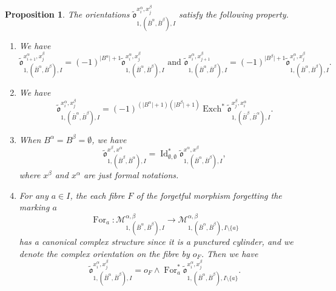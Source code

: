 \documentclass[11pt,a4paper]{article}
\newtheorem{prop}[dummy]{Proposition}
\theoremstyle{definition}
\theoremstyle{remark}
\numberwithin{equation}{section}
\DeclareMathOperator{\Id}{Id}
\begin{document}
\begin{prop}\label{prop orientation moduli g=1}
    The orientations $\tilde{\mathfrak o}^{x^\alpha_i,x^\beta_j}_{1,(\bar{B}^\alpha,\bar{B}^\beta),I}$ satisfy the following property.
    \begin{enumerate}
        \item \label{item orientation of moduli when change starting point genus one}
        We have
        \begin{equation}\label{eq orientation of moduli when change starting point genus one}
        \tilde{\mathfrak o}^{x^\alpha_{i+1},x^\beta_j}_{1,(\bar{B}^\alpha,\bar{B}^\beta),I}=(-1)^{\lvert B^\alpha \rvert+1}\tilde{\mathfrak o}^{x^\alpha_{i},x^\beta_j}_{1,(\bar{B}^\alpha,\bar{B}^\beta),I} \text{ and }
        \tilde{\mathfrak o}^{x^\alpha_{i},x^\beta_{j+1}}_{1,(\bar{B}^\alpha,\bar{B}^\beta),I}=(-1)^{\lvert B^\beta \rvert+1}\tilde{\mathfrak o}^{x^\alpha_{i},x^\beta_j}_{1,(\bar{B}^\alpha,\bar{B}^\beta),I}.
        \end{equation}
        \item \label{item orientation of moduli when exchanging boundary genus one} We have
        \begin{equation}\label{eq orientation moduli when exchange boundaries genus one}
            \tilde{\mathfrak o}^{x^\alpha_i,x^\beta_{j}}_{1,(\bar{B}^\alpha,\bar{B}^\beta),I}=(-1)^{(\lvert B^\alpha \rvert+1)(\lvert B^\beta \rvert+1)}\operatorname{Exch}^*\tilde{\mathfrak o}^{x^\beta_{j},x^\alpha_i}_{1,(\bar{B}^\beta,\bar{B}^\alpha),I}.
        \end{equation}
     

        \item \label{item orientation of moduli without boundary points id}
        When $B^\alpha=B^\beta=\emptyset$, we have
        \begin{equation}\label{eq orientation of moduli without boundary points id}
            \tilde{\mathfrak o}^{x^\beta,x^\alpha}_{1,(\bar{B}^\beta,\bar{B}^\alpha),I}=\Id_{\emptyset,\emptyset}^*\tilde{\mathfrak o}^{x^\alpha,x^\beta}_{1,(\bar{B}^\alpha,\bar{B}^\beta),I},
            \end{equation}
            where $x^\beta$ and $x^\alpha$ are just formal notations.        
        \item \label{item genus one moduli orientation forget internal marking}
        For any $a \in I$, the each fibre $F$ of the forgetful morphism forgetting the marking $a$
        $$
        \operatorname{For}_a\colon \mathcal M^{\alpha,\beta}_{1,(\bar{B}^\alpha,\bar{B}^\beta),I} \to \mathcal M^{\alpha,\beta}_{1,(\bar{B}^\alpha,\bar{B}^\beta),I\setminus\{a\}}
        $$
        has a canonical complex structure since it is a punctured cylinder, and we denote the complex orientation on the fibre by $o_F$. Then we have $$\tilde{\mathfrak o}^{x^\alpha_{i},x^\beta_j}_{1,(\bar{B}^\alpha,\bar{B}^\beta),I}=o_F\wedge \operatorname{For}_a^*\tilde{\mathfrak o}^{x^\alpha_{i},x^\beta_j}_{1,(\bar{B}^\alpha,\bar{B}^\beta),I\setminus\{a\}}.$$ 
       

\end{enumerate}
\end{prop}
\end{document}
